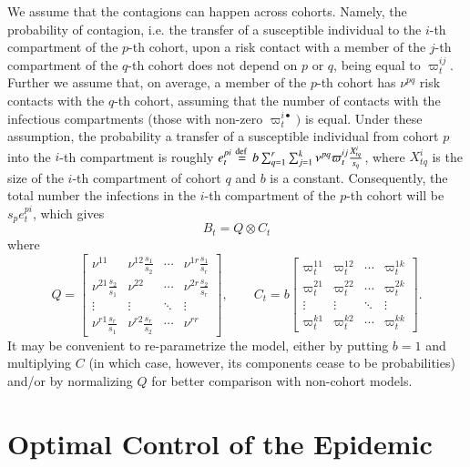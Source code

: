 \documentclass[english]{elsarticle}
\theoremstyle{plain}
\theoremstyle{remark}
\theoremstyle{plain}
\theoremstyle{definition}
\begin{document}
We assume that the contagions can happen across cohorts. Namely, the
probability of contagion, i.e. the transfer of a susceptible individual
to the $i$-th compartment of the $p$-th cohort, upon a risk contact
with a member of the $j$-th compartment of the $q$-th cohort does
not depend on $p$ or $q$, being equal to $\varpi_{t}^{ij}$. Further
we assume that, on average, a member of the $p$-th cohort has $\nu^{pq}$
risk contacts with the $q$-th cohort, assuming that the number of
contacts with the infectious compartments (those with non-zero $\varpi_{t}^{i\bullet})$
is equal. Under these assumption, the probability a transfer of a
susceptible individual from cohort $p$ into the $i$-th compartment
is roughly $e_{t}^{pi}\stackrel{\text{def }}{=} b\sum_{q=1}^{r}\sum_{j=1}^{k}\nu^{pq}\varpi_{t}^{ij}\frac{X_{tq}^{i}}{s_{q}}$,
where $X_{tq}^{i}$ is the size of the $i$-th compartment of cohort
$q$ and $b$ is a constant. Consequently, the total number the infections
in the $i$-th compartment of the $p$-th cohort will be $s_{p}e_{t}^{pi}$,
which gives 
\[
B_{t}=Q\otimes C_{t}
\]
where 
\[
Q=\left[\begin{array}{cccc}
\nu^{11} & \nu^{12}\frac{s_{1}}{s_{2}} & \cdots & \nu^{1r}\frac{s_{1}}{s_{r}}\\
\nu^{21}\frac{s_{2}}{s_{1}} & \nu^{22} & \cdots & \nu^{2r}\frac{s_{2}}{s_{r}}\\
\vdots & \vdots & \ddots & \vdots\\
\nu^{r1}\frac{s_{r}}{s_{1}} & \nu^{r2}\frac{s_{r}}{s_{2}} & \cdots & \nu^{rr}
\end{array}\right],\qquad C_{t}=b\left[\begin{array}{cccc}
\varpi_{t}^{11} & \varpi_{t}^{12} & \cdots & \varpi_{t}^{1k}\\
\varpi_{t}^{21} & \varpi_{t}^{22} & \cdots & \varpi_{t}^{2k}\\
\vdots & \vdots & \ddots & \vdots\\
\varpi_{t}^{k1} & \varpi_{t}^{k2} & \cdots & \varpi_{t}^{kk}
\end{array}\right].
\]
It may be convenient to re-parametrize the model, either by putting $b=1$ and multiplying $C$ (in which case, however, its components cease to be probabilities) and/or by normalizing $Q$ for better comparison with non-cohort models. 

\section{Optimal Control of the Epidemic\label{sec:oc}}
\end{document}

